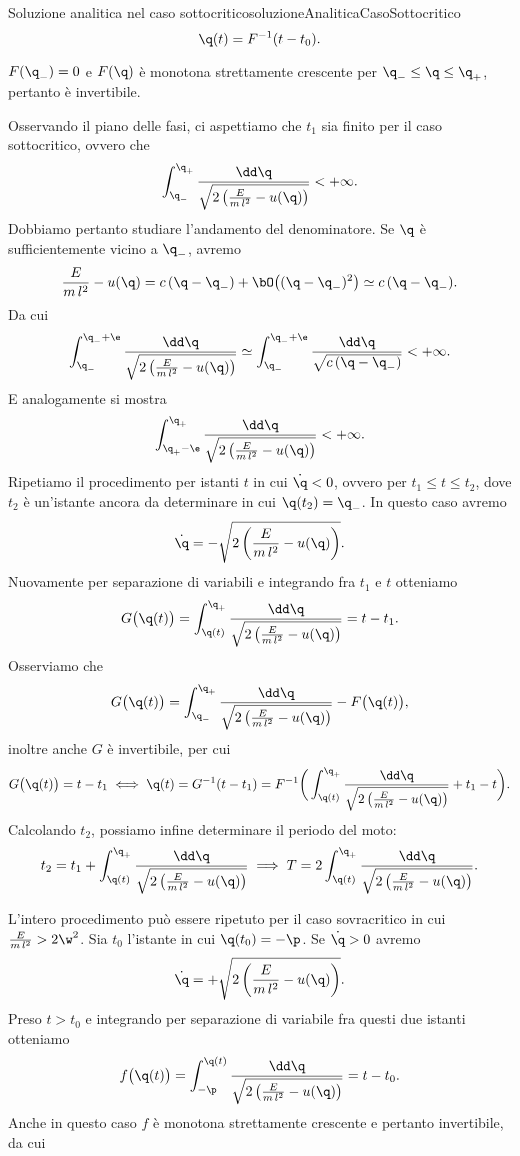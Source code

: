 \begin{remark}{Soluzione analitica nel caso sottocritico}{soluzioneAnaliticaCasoSottocritico}
	\[
		\q(t) = F^{-1}(t-t_0).
	\]
\end{remark}

\begin{oss}
	\(F(\q_-)=0\) e \(F(\q)\) è monotona strettamente crescente per \(\q_-\le \q \le \q_+\), pertanto è invertibile.
\end{oss}
\noindent
Osservando il piano delle fasi, ci aspettiamo che \(t_1\) sia finito per il caso sottocritico, ovvero che
\[
	\int_{\q_-}^{\q_+} \frac{\dd\q}{\sqrt{2 \left( \frac{E}{m\,l^2}-u(\q) \right)}} < +\infty.
\]
Dobbiamo pertanto studiare l'andamento del denominatore. Se \(\q\) è sufficientemente vicino a \(\q_-\), avremo
\[
	\frac{E}{m\,l^2} - u(\q) = c\,(\q-\q_-) + \bO\big((\q-\q_-)^2\big) \simeq c\,(\q-\q_-).
\]
Da cui
\[
	\int_{\q_-}^{\q_-+\e} \frac{\dd\q}{\sqrt{2 \left( \frac{E}{m\,l^2}-u(\q) \right)}} \simeq \int_{\q_-}^{\q_-+\e} \frac{\dd\q}{\sqrt{c\,(\q-\q_-)}} < +\infty.
\]
E analogamente si mostra
\[
	\int_{\q_+-\e}^{\q_+} \frac{\dd\q}{\sqrt{2 \left( \frac{E}{m\,l^2}-u(\q) \right)}} < +\infty.
\]
Ripetiamo il procedimento per istanti \(t\) in cui \(\dot{\q}<0\), ovvero per \(t_1\le t \le t_2\), dove \(t_2\) è un'istante ancora da determinare in cui \(\q(t_2)=\q_-\). In questo caso avremo
\[
	\dot{\q} = -\sqrt{2 \left( \frac{E}{m\,l^2}-u(\q) \right)}.
\]
Nuovamente per separazione di variabili e integrando fra \(t_1\) e \(t\) otteniamo
\[
	G\big(\q(t)\big) = \int_{\q(t)}^{\q_+} \frac{\dd\q}{\sqrt{2 \left( \frac{E}{m\,l^2}-u(\q) \right)}} = t-t_1.
\]
Osserviamo che
\[
	G\big(\q(t)\big) = \int_{\q_-}^{\q_+} \frac{\dd\q}{\sqrt{2 \left( \frac{E}{m\,l^2}-u(\q) \right)}} - F\big(\q(t)\big),
\]
inoltre anche \(G\) è invertibile, per cui
\[
	G\big(\q(t)\big) = t-t_1 \iff \q(t) = G^{-1}(t-t_1) = F^{-1} \bigg( \int_{\q(t)}^{\q_+} \frac{\dd\q}{\sqrt{2 \left( \frac{E}{m\,l^2}-u(\q) \right)}} + t_1-t \bigg).
\]
Calcolando \(t_2\), possiamo infine determinare il periodo del moto:
\[
	t_2 = t_1 + \int_{\q(t)}^{\q_+} \frac{\dd\q}{\sqrt{2 \left( \frac{E}{m\,l^2}-u(\q) \right)}} \implies T = 2\int_{\q(t)}^{\q_+} \frac{\dd\q}{\sqrt{2 \left( \frac{E}{m\,l^2}-u(\q) \right)}}.
\]

L'intero procedimento può essere ripetuto per il caso sovracritico in cui \(\frac{E}{m\,l^2} > 2\w^2\).
Sia \(t_0\) l'istante in cui \(\q(t_0)=-\p\). Se \(\dot{\q}>0\) avremo
\[
	\dot{\q} = +\sqrt{2 \left( \frac{E}{m\,l^2}-u(\q) \right)}.
\]
Preso \(t>t_0\) e integrando per separazione di variabile fra questi due istanti otteniamo
\[
	f\big(\q(t)\big) = \int_{-\p}^{\q(t)} \frac{\dd \q}{\sqrt{2 \left( \frac{E}{m\,l^2}-u(\q) \right)}} = t-t_0.
\]
Anche in questo caso \(f\) è monotona strettamente crescente e pertanto invertibile, da cui

